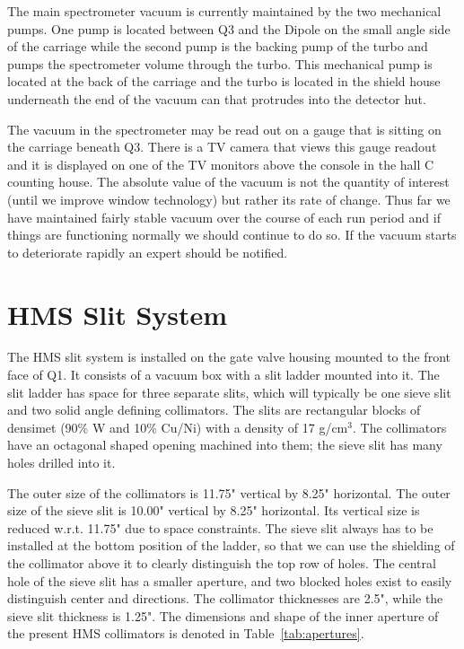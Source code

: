 {The main spectrometer vacuum
is currently maintained by the two mechanical pumps.
One pump is located between Q3 and the Dipole on the small angle
side of the carriage while the second pump is the backing
pump of the turbo and pumps the spectrometer volume through the turbo.
This mechanical pump is located
at the back of the carriage and the turbo is located in the shield house
underneath the end of the vacuum can that protrudes into the detector hut.

The vacuum in the spectrometer may be read out on a gauge that is sitting on the
carriage beneath Q3. There is a TV camera that views this gauge readout and
it is displayed on one of the TV monitors above the console in the hall
C counting house. The absolute value of the vacuum is not the quantity
of interest (until we improve window technology) but rather its rate of change.
Thus far we have maintained fairly stable vacuum over the course of each run
period and if things are functioning normally we should continue to do so.
If the vacuum starts to deteriorate rapidly an expert should be notified.



\section{HMS Slit System}
\label{sec:hms_slit}

The HMS slit system is installed on the gate valve housing mounted to the
front face of Q1. It consists of a vacuum box with a slit ladder
mounted into it. The slit ladder has space for three separate slits,
which will typically be one sieve slit and two solid angle defining collimators.
The slits are rectangular blocks of densimet (90\% W and 10\% Cu/Ni)
with a density of 17 g/cm$^3$. The collimators have an octagonal shaped
opening machined into them; the sieve slit has many holes drilled
into it.

The outer size of the collimators is 11.75" vertical by 8.25"
horizontal. The outer size of the sieve slit is 10.00" vertical
by 8.25" horizontal.
Its vertical size is reduced w.r.t. 11.75" due to space constraints.
The sieve slit always has to be installed at the bottom position of the ladder,
so that we can use the shielding of the collimator above it to
clearly distinguish the top row of holes. The central hole
of the sieve slit has a smaller aperture, and two blocked holes
exist to easily distinguish center and directions.
The collimator thicknesses are 2.5", while the sieve slit thickness
is 1.25". The dimensions and shape of the inner aperture of the present
HMS collimators is denoted in Table~\ref{tab:apertures}.

}
